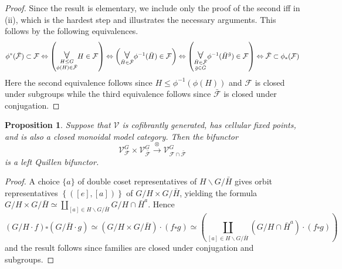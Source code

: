 \documentclass[a4paper,10pt
,draft
]{article}%
\numberwithin{equation}{section}
\numberwithin{figure}{section}
\newtheorem{proposition}[equation]{Proposition}%
\theoremstyle{definition} %
\newcommand{\1}{\ensuremath{\mathbbm 1}}%
\begin{document}
\begin{proof}
	Since the result is elementary, we include only the proof of the second iff in (ii), which is the hardest step and illustrates the necessary arguments. This follows by the following equivalences.
\[
	\phi^{\**} (\bar{\mathcal{F}}) \subset \mathcal{F}
\Leftrightarrow
	\left( \underset{ \substack{H \leq G \\ \phi(H) \in \bar{\mathcal{F}} }}{\mathlarger{\mathlarger{\forall}}} 
	H \in \mathcal{F} \right)
\Leftrightarrow
	\left( \underset{\bar{H} \in \bar{\mathcal{F}}}{\mathlarger{\mathlarger{\forall}}}
	\phi^{-1}(\bar{H}) \in \mathcal{F}
	\right)
\Leftrightarrow
	\left( \underset{ \substack{\bar{H} \in \bar{\mathcal{F}}\\\bar{g} \in \bar{G}}}{\mathlarger{\mathlarger{\forall}}}
	\phi^{-1}(\bar{H}^{\bar{g}}) \in \mathcal{F}
	\right)
\Leftrightarrow
        \bar{\mathcal F} \subset \phi_{\**}(\mathcal F)
\]
Here the second equivalence follows since 
$H \leq \phi^{-1}(\phi(H))$ and $\mathcal{F}$ is closed under subgroups while the third equivalence follows since 
$\bar{\mathcal{F}}$ is closed under conjugation. 
\end{proof}


\begin{proposition}\label{BIQUILLENG PROP}
	Suppose that $\mathcal{V}$ is cofibrantly generated, has cellular fixed points, and is also a closed monoidal model category. 	
	Then the bifunctor
\[
	\mathcal{V}^G_{\mathcal{F}}
		\times
	\mathcal{V}^G_{\bar{\mathcal{F}}}
		\xrightarrow{\otimes}
	\mathcal{V}^G_{\mathcal{F} \cap \bar{\mathcal{F}}}
\]
	is a left Quillen bifunctor.
\end{proposition}


\begin{proof}
	A choice $\{a\}$ of double coset representatives
	of $H \backslash G /\bar{H}$
	gives orbit representatives
	$\left\{([e],[a])\right\}$ of
	$G/H \times G/\bar{H}$,
	yielding the formula
	$G/H \times G/\bar{H}
	\simeq 
	\coprod_{[a]\in H \backslash G /\bar{H}}
	{G/H\cap \bar{H}^a}
	$.
%
	Hence	
\[
	\left(G/H \cdot f\right) \square \left(G/\bar{H} \cdot g\right)
		\simeq
	\left(G/H \times G/\bar{H}\right) \cdot \left(f \square g\right)
		\simeq
	\left(
		\coprod_{[a]\in H \backslash G /\bar{H}}
		{\left(G/H\cap \bar{H}^a\right)} \cdot (f \square g)
	\right)
\]
and the result follows since families are closed under conjugation and subgroups.
\end{proof}
\end{document}
